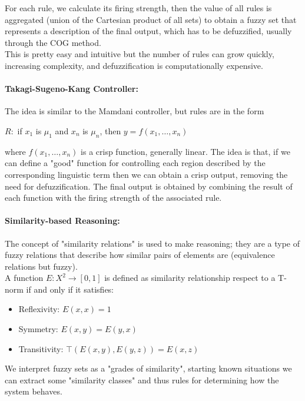 For each rule, we calculate its firing strength, then the value of all rules is aggregated (union of the Cartesian product of all sets) to obtain a fuzzy set that represents a description of the final output, which has to be defuzzified, usually through the COG method.\\

This is pretty easy and intuitive but the number of rules can grow quickly, increasing complexity, and defuzzification is computationally expensive.\\

\paragraph{Takagi-Sugeno-Kang Controller:} The idea is similar to the Mamdani controller, but rules are in the form
\begin{center}
	$R:$ if $x_1$ is $\mu_1$ and $x_n$ is $\mu_n$, then $y = f(x_1, \dots , x_n)$ 
\end{center}
where $f(x_1, \dots , x_n)$ is a crisp function, generally linear. The idea is that, if we can define a "good" function for controlling each region described by the corresponding linguistic term then we can obtain a crisp output, removing the need for defuzzification. The final output is obtained by combining the result of each function with the firing strength of the associated rule.\\

\paragraph{Similarity-based Reasoning:} The concept of "similarity relations" is used to make reasoning; they are a type of fuzzy relations that describe how similar pairs of elements are (equivalence relations but fuzzy). \\

A function $E:X^2 \rightarrow [0,1]$ is defined as similarity relationship respect to a T-norm if and only if it satisfies:
\begin{itemize}
	\item Reflexivity: $E(x,x) = 1$ 
	\item Symmetry: $E(x,y) = E(y,x)$
	\item Transitivity: $\top (E(x,y),E(y,z)) = E(x,z)$
\end{itemize}

We interpret fuzzy sets as a "grades of similarity", starting known situations we can extract some "similarity classes" and thus rules for determining how the system behaves.\\

